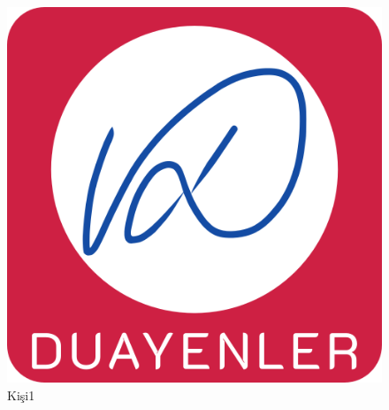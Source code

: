 \begin{minipage}{0.28\textwidth}
\begin{flushleft} \large

\begin{figure}[H]
\center
\setlength{\unitlength}{\textwidth} 
\includegraphics[width=0.7\unitlength]{images/logo1}
\caption{\label{fig:kisi1}Kişi1 }
\end{figure}


\end{flushleft}
\end{minipage}
\begin{minipage}{0.8\textwidth}
\begin{flushleft} 

\blindtext

\end{flushleft}
\end{minipage}\\[0.8cm]



